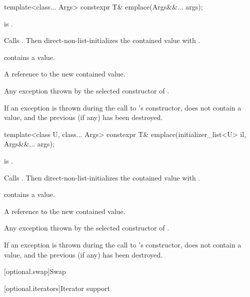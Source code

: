 %
\begin{itemdecl}
template<class... Args> constexpr T& emplace(Args&&... args);
\end{itemdecl}

\begin{itemdescr}
\pnum
\mandates
{} is .

\pnum
\effects
Calls . Then direct-non-list-initializes the contained value
with .

\pnum
\ensures
{} contains a value.

\pnum
\returns
A reference to the new contained value.

\pnum
\throws
Any exception thrown by the selected constructor of .

\pnum
\remarks
If an exception is thrown during the call to 's constructor,  does not contain a value, and the previous  (if any) has been destroyed.
\end{itemdescr}

%
\begin{itemdecl}
template<class U, class... Args> constexpr T& emplace(initializer_list<U> il, Args&&... args);
\end{itemdecl}

\begin{itemdescr}
\pnum
\constraints
{} is .

\pnum
\effects
Calls . Then direct-non-list-initializes the contained value with
.

\pnum
\ensures
{} contains a value.

\pnum
\returns
A reference to the new contained value.

\pnum
\throws
Any exception thrown by the selected constructor of .

\pnum
\remarks
If an exception is thrown during the call to 's constructor,  does not contain a value, and the previous  (if any) has been destroyed.
\end{itemdescr}


[optional.swap]{Swap}

[optional.iterators]{Iterator support}


